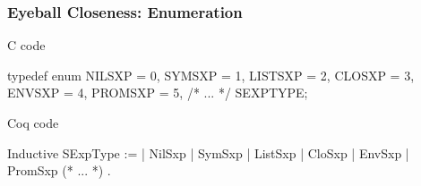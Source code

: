 \documentclass{beamer}
\begin{document}
\begin{frame}[fragile]
    \frametitle{Eyeball Closeness: Enumeration}

    \begin{minipage}{.45\textwidth}
        C code

\begin{ccode}
typedef enum {
    NILSXP  = 0,
    SYMSXP  = 1,
    LISTSXP = 2,
    CLOSXP  = 3,
    ENVSXP  = 4,
    PROMSXP = 5,
    /* ... */
} SEXPTYPE;
\end{ccode}

    \end{minipage}
    \qquad
    \begin{minipage}{.45\textwidth}
        Coq code

\begin{coqcode}
Inductive SExpType :=
  | NilSxp
  | SymSxp
  | ListSxp
  | CloSxp
  | EnvSxp
  | PromSxp
  (* ... *)
  .
\end{coqcode}

    \end{minipage}


\end{frame}
\end{document}
